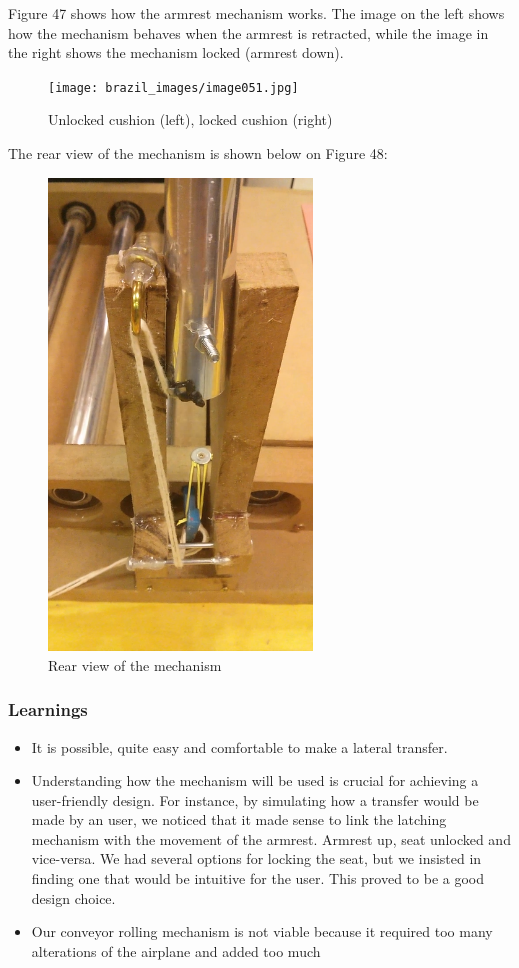 Figure 47 shows how the armrest mechanism works. The image on the left shows how the mechanism behaves when the armrest is retracted, while the image in the right shows the mechanism locked (armrest down).

\begin{figure}[h]
\centering
\texttt{[image: brazil\_images/image051.jpg]}
\caption{Unlocked cushion (left), locked cushion (right)}
\label{fig:cushion}
\end{figure}


The rear view of the mechanism is shown below on Figure 48:

\begin{figure}[h]
\centering
\includegraphics[width=7cm]{brazil_images/image053.png}
\caption{Rear view of the mechanism}
\label{fig:rear_view}
\end{figure}


\subsubsection{Learnings}

\begin{itemize}
	\item It is possible, quite easy and comfortable to make a lateral transfer.
	\item Understanding how the mechanism will be used is crucial for achieving a user-friendly design. For instance, by simulating how a transfer would be made by an user, we noticed that it made sense to link the latching mechanism with the movement of the armrest. Armrest up, seat unlocked and vice-versa. We had several options for locking the seat, but we insisted in finding one that would be intuitive for the user. This proved to be a good design choice.
	\item Our conveyor rolling mechanism is not viable because it required too many alterations of the airplane and added too much 
\end{itemize}


